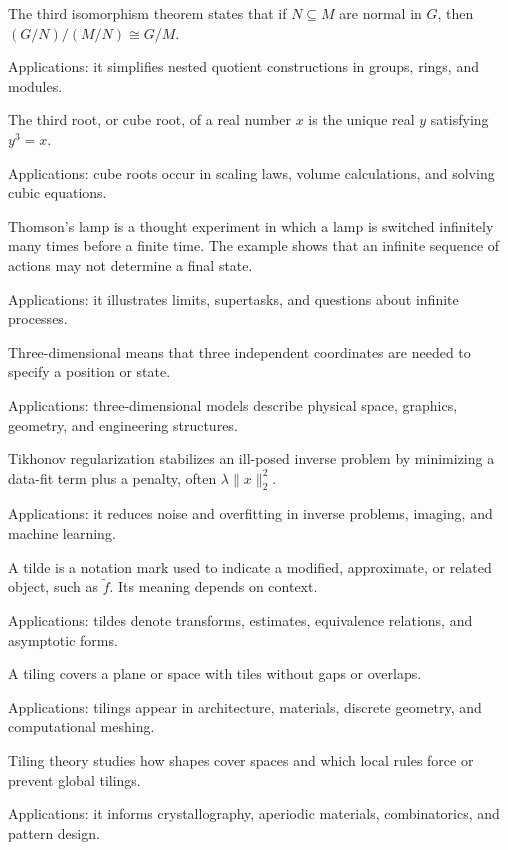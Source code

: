 The third isomorphism theorem states that if $N\subseteq M$ are normal in $G$, then $(G/N)/(M/N)\cong G/M$. \par\noindent Applications: it simplifies nested quotient constructions in groups, rings, and modules.

The third root, or cube root, of a real number $x$ is the unique real $y$ satisfying $y^3=x$. \par\noindent Applications: cube roots occur in scaling laws, volume calculations, and solving cubic equations.

Thomson's lamp is a thought experiment in which a lamp is switched infinitely many times before a finite time. The example shows that an infinite sequence of actions may not determine a final state. \par\noindent Applications: it illustrates limits, supertasks, and questions about infinite processes.

Three-dimensional means that three independent coordinates are needed to specify a position or state. \par\noindent Applications: three-dimensional models describe physical space, graphics, geometry, and engineering structures.

Tikhonov regularization stabilizes an ill-posed inverse problem by minimizing a data-fit term plus a penalty, often $\lambda\|x\|_2^2$. \par\noindent Applications: it reduces noise and overfitting in inverse problems, imaging, and machine learning.

A tilde is a notation mark used to indicate a modified, approximate, or related object, such as $\tilde f$. Its meaning depends on context. \par\noindent Applications: tildes denote transforms, estimates, equivalence relations, and asymptotic forms.

A tiling covers a plane or space with tiles without gaps or overlaps. \par\noindent Applications: tilings appear in architecture, materials, discrete geometry, and computational meshing.

Tiling theory studies how shapes cover spaces and which local rules force or prevent global tilings. \par\noindent Applications: it informs crystallography, aperiodic materials, combinatorics, and pattern design.

